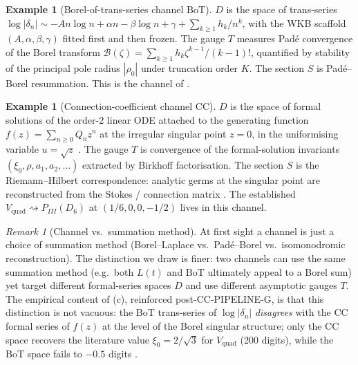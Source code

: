 \documentclass[11pt,reqno]{amsart}
\theoremstyle{plain}
\theoremstyle{definition}
\newtheorem{example}[theorem]{Example}
\theoremstyle{remark}
\newtheorem{remark}[theorem]{Remark}
\newcommand{\Lt}{L(t)}
\newcommand{\BoT}{\mathrm{BoT}}
\newcommand{\CC}{\mathrm{CC}}
\newcommand{\Vquad}{V_{\mathrm{quad}}}
\newcommand{\dn}{\delta_{n}}
\newcommand{\Borel}{\mathcal{B}}
\begin{document}
\begin{example}[Borel-of-trans-series channel $\BoT$]
\label{ex:bot}
$D$ is the space of trans-series
$\log|\dn| \sim -A n \log n + \alpha n - \beta \log n
+ \gamma + \sum_{k \ge 1} h_k / n^k$,
with the WKB scaffold $(A,\alpha,\beta,\gamma)$ fitted first
and then frozen. The gauge $T$ measures Pad\'e convergence
of the Borel transform
$\Borel(\zeta) = \sum_{k \ge 1} h_k \zeta^{k-1}/(k-1)!$,
quantified by stability of the principal pole radius
$|\rho_0|$ under truncation order $K$. The section $S$ is
Pad\'e--Borel resummation. This is the channel of
\cite{siarc_borel_5x, siarc_borel_kscan}.
\end{example}

\begin{example}[Connection-coefficient channel $\CC$]
\label{ex:cc}
$D$ is the space of formal solutions of the order-$2$ linear
ODE attached to the generating function
$f(z) = \sum_{n \ge 0} Q_n z^n$ at the irregular singular
point $z=0$, in the uniformising variable $u = \sqrt z$
\cite{siarc_cc_pipeline_g}. The gauge $T$ is convergence of
the formal-solution invariants
$(\xi_0, \rho, a_1, a_2, \ldots)$ extracted by Birkhoff
factorisation. The section $S$ is the Riemann--Hilbert
correspondence: analytic germs at the singular point are
reconstructed from the Stokes / connection matrix
\cite{lodayrichaud2016divergent, boalch2001stokes}. The
established $\Vquad \rightsquigarrow P_{III}(D_6)$ at
$(1/6,0,0,-1/2)$ \cite{iwasaki1991from, ohyama2006studies}
lives in this channel.
\end{example}

\begin{remark}[Channel vs.\ summation method]
\label{rem:channel-vs-sum}
At first sight a channel is just a choice of summation method
(Borel--Laplace vs.\ Pad\'e--Borel vs.\ isomonodromic
reconstruction). The distinction we draw is finer: two
channels can use the same summation method (e.g.\ both $\Lt$
and $\BoT$ ultimately appeal to a Borel sum) yet target
different formal-series spaces $D$ and use different
asymptotic gauges $T$. The empirical content of
(c), reinforced post-CC-PIPELINE-G, is
that this distinction is not vacuous: the BoT trans-series of
$\log|\dn|$ \emph{disagrees} with the $\CC$ formal series of
$f(z)$ at the level of the Borel singular structure; only the
$\CC$ space recovers the literature value $\xi_0 = 2/\sqrt 3$
for $\Vquad$ (200 digits), while the BoT space fails to
$-0.5$ digits \cite{siarc_cc_pipeline_f}.
\end{remark}
\end{document}
